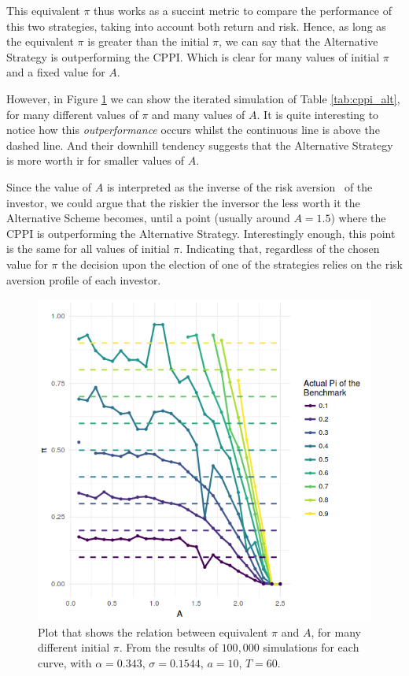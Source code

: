 This equivalent $\pi$ thus works as a succint metric to compare the performance of this two strategies, taking into account both return and risk. Hence, as long as the equivalent $\pi$ is greater than the initial $\pi$, we can say that the Alternative Strategy is outperforming the CPPI. Which is clear for many values of initial $\pi$ and a fixed value for $A$.

However, in Figure \ref{fig:pi-A_all-pis} we can show the iterated simulation of Table \ref{tab:cppi_alt}, for many different values of $\pi$ and many values of $A$. It is quite interesting to notice how this \emph{outperformance} occurs whilst the continuous line is above the dashed line. And their downhill tendency suggests that the Alternative Strategy is more worth ir for smaller values of $A$.

Since the value of $A$ is interpreted as the inverse of the risk aversion~\cite{a:guillen-optimisation} of the investor, we could argue that the riskier the inversor the less worth it the Alternative Scheme becomes, until a point (usually around $A = 1.5$) where the CPPI is outperforming the Alternative Strategy. Interestingly enough, this point is the same for all values of initial $\pi$. Indicating that, regardless of the chosen value for $\pi$ the decision upon the election of one of the strategies relies on the risk aversion profile of each investor.


\begin{figure}[h]
    \centering
    \includegraphics[scale=0.75]{./images/pi-A-all-pis.png}
    \caption{Plot that shows the relation between equivalent $\pi$ and $A$, for many different initial $\pi$. From the results of $100,000$ simulations for each curve, with $\alpha = 0.343$, $\sigma = 0.1544$, $a = 10$, $T = 60$.}
    \label{fig:pi-A_all-pis}
\end{figure}


